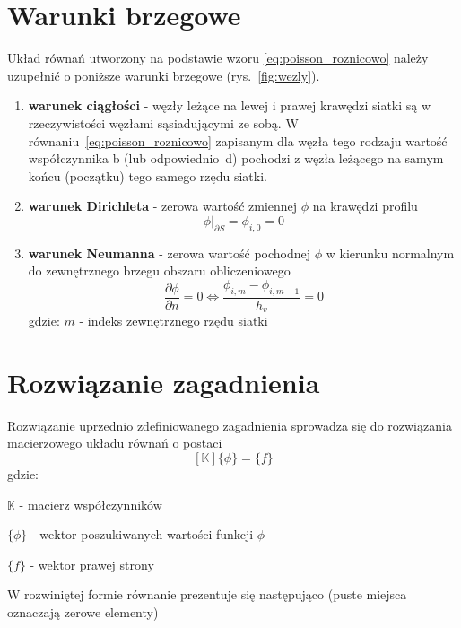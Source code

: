 \section{Warunki brzegowe}
\indent\indent Układ równań utworzony na podstawie wzoru \ref{eq:poisson_roznicowo} należy uzupełnić o poniższe warunki brzegowe (rys.~\ref{fig:wezly}).
\begin{enumerate}
\item \textbf{warunek ciągłości} - węzły leżące na lewej i prawej krawędzi siatki są w rzeczywistości węzłami sąsiadującymi ze sobą. W równaniu~\ref{eq:poisson_roznicowo} zapisanym dla węzła tego rodzaju wartość współczynnika \textsf{b} (lub odpowiednio~\textsf{d}) pochodzi z węzła leżącego na samym końcu (początku) tego samego rzędu siatki.
\item \textbf{warunek Dirichleta} - zerowa wartość zmiennej $\phi$ na krawędzi profilu
\begin{equation}
\phi\big|_{\partial S} = \phi_{i,0} = 0
\end{equation}
\item \textbf{warunek Neumanna} - zerowa wartość pochodnej $\phi$ w kierunku normalnym do zewnętrznego brzegu obszaru obliczeniowego \begin{equation}
\frac{\partial\phi}{\partial n}=0 \iff \frac{\phi_{i,m}-\phi_{i,m-1}}{h_v}=0
\end{equation}
gdzie: $m$ - indeks zewnętrznego rzędu siatki
\end{enumerate}

\section{Rozwiązanie zagadnienia}

\indent\indent Rozwiązanie uprzednio zdefiniowanego zagadnienia sprowadza się do rozwiązania macierzowego układu równań o postaci
\begin{equation}
\left[\mathbb{K}\right]\{\phi\}=\{f\}
\end{equation}
\noindent gdzie:
\begin{description}\addtolength{\itemsep}{-1.5\baselineskip}
  \item[\quad]$\mathbb{K}$ - macierz współczynników
  \item[\quad]$\{\phi\}$ - wektor poszukiwanych wartości funkcji $\phi$
  \item[\quad]$\{f\}$ - wektor prawej strony
\end{description}
\noindent W rozwiniętej formie równanie prezentuje się następująco (puste miejsca oznaczają zerowe elementy)

